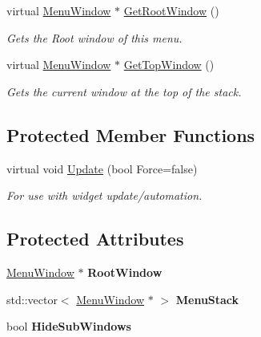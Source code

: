\begin{DoxyCompactItemize}
virtual \hyperlink{classphys_1_1UI_1_1MenuWindow}{MenuWindow} $\ast$ \hyperlink{classphys_1_1UI_1_1Menu_a9926f44b122c804b68034a759ea4a967}{GetRootWindow} ()
\begin{DoxyCompactList}\small\item\em Gets the Root window of this menu. \item\end{DoxyCompactList}\item 
virtual \hyperlink{classphys_1_1UI_1_1MenuWindow}{MenuWindow} $\ast$ \hyperlink{classphys_1_1UI_1_1Menu_acf9a3bc3dd097093cce077cc60c14a6f}{GetTopWindow} ()
\begin{DoxyCompactList}\small\item\em Gets the current window at the top of the stack. \item\end{DoxyCompactList}\end{DoxyCompactItemize}
\subsection*{Protected Member Functions}
\begin{DoxyCompactItemize}
\item 
\hypertarget{classphys_1_1UI_1_1Menu_a8759b8656fdbbc0e1231a3f8d2ad4835}{
virtual void \hyperlink{classphys_1_1UI_1_1Menu_a8759b8656fdbbc0e1231a3f8d2ad4835}{Update} (bool Force=false)}
\label{d6/dd3/classphys_1_1UI_1_1Menu_a8759b8656fdbbc0e1231a3f8d2ad4835}

\begin{DoxyCompactList}\small\item\em For use with widget update/automation. \item\end{DoxyCompactList}\end{DoxyCompactItemize}
\subsection*{Protected Attributes}
\begin{DoxyCompactItemize}
\item 
\hypertarget{classphys_1_1UI_1_1Menu_a03f7faf891c709b0a6123d4399018f30}{
\hyperlink{classphys_1_1UI_1_1MenuWindow}{MenuWindow} $\ast$ {\bfseries RootWindow}}
\label{d6/dd3/classphys_1_1UI_1_1Menu_a03f7faf891c709b0a6123d4399018f30}

\item 
\hypertarget{classphys_1_1UI_1_1Menu_a76096b5896d94bee6acb7cd0e03258db}{
std::vector$<$ \hyperlink{classphys_1_1UI_1_1MenuWindow}{MenuWindow} $\ast$ $>$ {\bfseries MenuStack}}
\label{d6/dd3/classphys_1_1UI_1_1Menu_a76096b5896d94bee6acb7cd0e03258db}

\item 
\hypertarget{classphys_1_1UI_1_1Menu_a695069775a855feb9eddab9f23c2e465}{
bool {\bfseries HideSubWindows}}
\label{d6/dd3/classphys_1_1UI_1_1Menu_a695069775a855feb9eddab9f23c2e465}

\end{DoxyCompactItemize}


